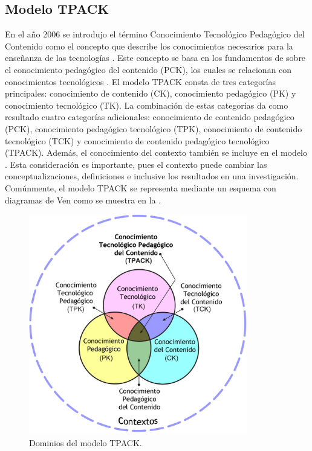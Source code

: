 \documentclass[spanish]{textolivre}
\begin{document}
\subsection{Modelo TPACK}\label{sec-conduta}
En el año 2006 se introdujo el término Conocimiento Tecnológico Pedagógico del Contenido como el concepto que describe los conocimientos necesarios para la enseñanza de las tecnologías \cite{mishra_technological_2006}. Este concepto se basa en los fundamentos de \textcite{shulman_those_1986,shulman_knowledge_1987} sobre el conocimiento pedagógico del contenido (PCK), los cuales se relacionan con conocimientos tecnológicos \cite{mishra_technological_2007}. El modelo TPACK consta de tres categorías principales: conocimiento de contenido (CK), conocimiento pedagógico (PK) y conocimiento tecnológico (TK). La combinación de estas categorías da como resultado cuatro categorías adicionales: conocimiento de contenido pedagógico (PCK), conocimiento pedagógico tecnológico (TPK), conocimiento de contenido tecnológico (TCK) y conocimiento de contenido pedagógico tecnológico (TPACK). Además, el conocimiento del contexto también se incluye en el modelo \cite{akarasriworn_mathematics_2010,mishra_technological_2006}. Esta consideración es importante, pues el contexto puede cambiar las conceptualizaciones, definiciones e inclusive los resultados en una investigación. Comúnmente, el modelo TPACK se representa mediante un esquema con diagramas de Ven como se muestra en la .

\begin{figure}[htbp]
 \centering
 \includegraphics[width=0.85\textwidth]{fig-001.jpeg.jpeg}
 \caption{Dominios del modelo TPACK.}
 \label{fig01}
\end{figure}
\end{document}
